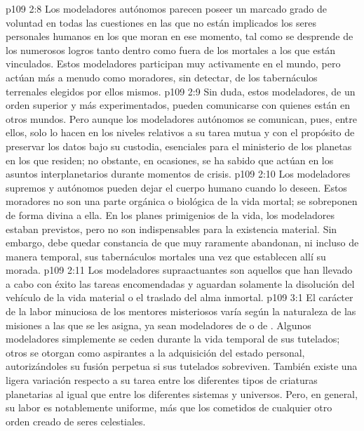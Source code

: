 \vs p109 2:8 \pc Los modeladores autónomos parecen poseer un marcado grado de voluntad en todas las cuestiones en las que no están implicados los seres personales humanos en los que moran en ese momento, tal como se desprende de los numerosos logros tanto dentro como fuera de los mortales a los que están vinculados. Estos modeladores participan muy activamente en el mundo, pero actúan más a menudo como moradores, sin detectar, de los tabernáculos terrenales elegidos por ellos mismos.
\vs p109 2:9 Sin duda, estos modeladores, de un orden superior y más experimentados, pueden comunicarse con quienes están en otros mundos. Pero aunque los modeladores autónomos se comunican, pues, entre ellos, solo lo hacen en los niveles relativos a su tarea mutua y con el propósito de preservar los datos bajo su custodia, esenciales para el ministerio de los planetas en los que residen; no obstante, en ocasiones, se ha sabido que actúan en los asuntos interplanetarios durante momentos de crisis.
\vs p109 2:10 Los modeladores supremos y autónomos pueden dejar el cuerpo humano cuando lo deseen. Estos moradores no son una parte orgánica o biológica de la vida mortal; se sobreponen de forma divina a ella. En los planes primigenios de la vida, los modeladores estaban previstos, pero no son indispensables para la existencia material. Sin embargo, debe quedar constancia de que muy raramente abandonan, ni incluso de manera temporal, sus tabernáculos mortales una vez que establecen allí su morada.
\vs p109 2:11 Los modeladores supraactuantes son aquellos que han llevado a cabo con éxito las tareas encomendadas y aguardan solamente la disolución del vehículo de la vida material o el traslado del alma inmortal.
\vs p109 3:1 El carácter de la labor minuciosa de los mentores misteriosos varía según la naturaleza de las misiones a las que se les asigna, ya sean modeladores de  o de . Algunos modeladores simplemente se ceden durante la vida temporal de sus tutelados; otros se otorgan como aspirantes a la adquisición del estado personal, autorizándoles su fusión perpetua si sus tutelados sobreviven. También existe una ligera variación respecto a su tarea entre los diferentes tipos de criaturas planetarias al igual que entre los diferentes sistemas y universos. Pero, en general, su labor es notablemente uniforme, más que los cometidos de cualquier otro orden creado de seres celestiales.
